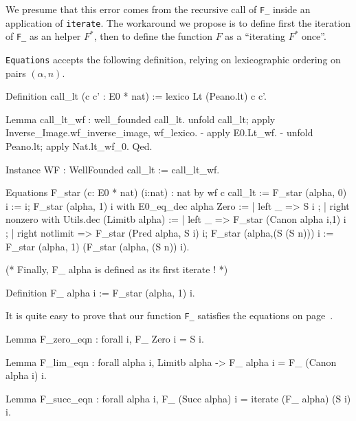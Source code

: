 We presume that this error comes from the recursive call of \texttt{F\_} inside
an application of \texttt{iterate}. The workaround we propose is to define first 
the iteration of \texttt{F\_}  as an helper $F^*$, then to define the function $F$ as a ``iterating $F^*$ once''.

\texttt{Equations} accepts the following definition, relying on  lexicographic ordering on pairs $(\alpha,n)$.


\label{sect:F-equations}

\label{Functions:F-alpha}
  
\begin{Coqsrc}
Definition call_lt (c c' : E0 * nat) :=
  lexico Lt (Peano.lt) c c'.

Lemma call_lt_wf : well_founded call_lt.
  unfold call_lt; apply Inverse_Image.wf_inverse_image,  wf_lexico.
  -  apply E0.Lt_wf.
  -  unfold Peano.lt; apply Nat.lt_wf_0. 
Qed.

Instance WF : WellFounded call_lt := call_lt_wf.

Equations  F_star (c: E0 * nat) (i:nat) :  nat by wf  c call_lt :=
    F_star (alpha, 0) i := i;
    F_star (alpha, 1) i
      with E0_eq_dec alpha Zero :=
           { | left _ => S i ;
             | right nonzero
                 with Utils.dec (Limitb alpha) :=
                 { | left _ => F_star (Canon alpha i,1) i ;
                   | right notlimit =>
                     F_star (Pred alpha, S i)  i}};
    F_star (alpha,(S (S n))) i :=
               F_star (alpha, 1) (F_star (alpha, (S n)) i).

(* Finally, F_ alpha is defined as its first iterate ! *)

Definition F_  alpha i := F_star (alpha, 1) i.
\end{Coqsrc}

It is quite easy to prove that our function \texttt{F\_} satisfies the equations on page~\pageref{sect:F-equations}.

\begin{Coqsrc}
Lemma F_zero_eqn : forall i, F_ Zero i = S i.

Lemma F_lim_eqn : forall alpha i,  Limitb alpha ->
                               F_ alpha i = F_ (Canon alpha i) i.

Lemma F_succ_eqn : forall alpha i,
    F_ (Succ alpha) i = iterate (F_ alpha) (S i) i.
\end{Coqsrc}

